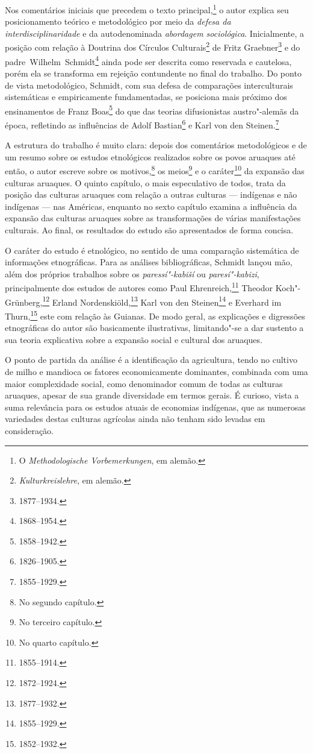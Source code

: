 Nos comentários iniciais que precedem o texto principal,\footnote{O \textit{Methodologische Vorbemerkungen}, em alemão.} o autor explica seu
posicionamento teórico e metodológico por meio da \emph{defesa da interdisciplinaridade}
e da autodenominada \emph{abordagem sociológica}. Inicialmente, a posição com
relação à Doutrina dos Círculos Culturais\footnote{\textit{Kulturkreislehre}, em alemão.} de Fritz Graebner\footnote{1877--1934.} e do padre~Wilhelm~Schmidt\footnote{1868--1954.} ainda pode ser descrita como reservada e cautelosa, porém ela se transforma em
rejeição contundente no final do trabalho. Do ponto de vista
metodológico, Schmidt, com sua defesa de comparações interculturais
sistemáticas e empiricamente fundamentadas, se posiciona mais próximo
dos ensinamentos de Franz Boas\footnote{1858--1942.} do que das teorias
difusionistas austro"-alemãs da época, refletindo as influências de
Adolf Bastian\footnote{1826--1905.} e Karl von den Steinen.\footnote{1855--1929.}

A estrutura do trabalho é muito clara: depois dos comentários
metodológicos e de um resumo sobre os estudos etnológicos realizados
sobre os povos aruaques até então, o autor escreve sobre os motivos,\footnote{No segundo capítulo.} os meios\footnote{No terceiro capítulo.} e o caráter\footnote{No quarto capítulo.} da expansão das
culturas aruaques. O quinto capítulo, o mais especulativo de todos, trata da
posição das culturas aruaques com relação a outras culturas --- indígenas
e não indígenas --- nas Américas, enquanto no sexto capítulo examina a
influência da expansão das culturas aruaques sobre as transformações de
várias manifestações culturais. Ao final, os resultados do estudo são
apresentados de forma concisa.

O caráter do estudo é etnológico, no sentido de uma comparação
sistemática de informações etnográficas. Para as análises
bibliográficas, Schmidt lançou mão, além dos próprios trabalhos sobre os
\textit{paressí"-kabiší} ou \textit{paresí"-kabizi}, principalmente dos estudos de
autores como Paul Ehrenreich,\footnote{1855--1914.} Theodor Koch"-Grünberg,\footnote{1872--1924.} Erland Nordenskiöld,\footnote{1877--1932.} Karl von den Steinen\footnote{1855--1929.} e Everhard im Thurn,\footnote{1852--1932.} este com relação às Guianas. De modo geral, as explicações e digressões etnográficas do autor são basicamente ilustrativas, 
limitando"-se a dar sustento a sua teoria explicativa sobre a expansão social e cultural dos aruaques.

O ponto de partida da análise é a identificação da
agricultura, tendo no cultivo de milho e mandioca os fatores economicamente
dominantes, combinada com uma maior complexidade social, como
denominador comum de todas as culturas aruaques, apesar de sua grande
diversidade em termos gerais. É curioso, vista a suma relevância para os estudos
atuais de economias indígenas, que as numerosas
variedades destas culturas agrícolas ainda não tenham sido levadas em
consideração.

